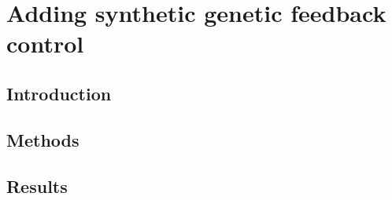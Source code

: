 \documentclass[../main.tex]{subfiles}
\begin{document}
\chapter{Adding synthetic genetic feedback control}
\label{chapter5}
\section{Introduction}

\label{chapter5:introduction}
\section{Methods}

\label{chapter5:methods}
\section{Results}

\label{chapter5:results}
\end{document}
